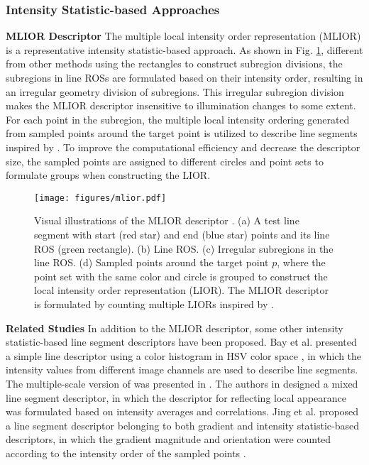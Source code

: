 \documentclass[journal,compsoc]{IEEEtran}
\begin{document}
\subsubsection{Intensity Statistic-based Approaches}
\label{subsec_description_statistic_intensity}
\textbf{MLIOR Descriptor} The multiple local intensity order representation (MLIOR) \cite{ALineMatchingMethodBasedonMultipleIntensityOrderingwithUniformlySpacedSampling} is a representative intensity statistic-based approach. As shown in Fig. \ref{mlior_demo}, different from other methods \cite{LBD,MSLD} using the rectangles to construct subregion divisions, the subregions in line ROSs are formulated based on their intensity order, resulting in an irregular geometry division of subregions. This irregular subregion division makes the MLIOR descriptor insensitive to illumination changes to some extent. For each point in the subregion, the multiple local intensity ordering generated from sampled points around the target point is utilized to describe line segments inspired by \cite{LIOP}. To improve the computational efficiency and decrease the descriptor size, the sampled points are assigned to different circles and point sets to formulate groups when constructing the LIOR.

\begin{figure}[tbp]
	\centering
	\texttt{[image: figures/mlior.pdf]}
	\caption{Visual illustrations of the MLIOR descriptor \cite{ALineMatchingMethodBasedonMultipleIntensityOrderingwithUniformlySpacedSampling}. (a) A test line segment with start (red star) and end (blue star) points and its line ROS (green rectangle). (b) Line ROS. (c) Irregular subregions in the line ROS. (d) Sampled points around the target point $p$, where the point set with the same color and circle is grouped to construct the local intensity order representation (LIOR). The MLIOR descriptor is formulated by counting multiple LIORs inspired by \cite{LIOP}.}
	\label{mlior_demo}
\end{figure}

\textbf{Related Studies}
In addition to the MLIOR descriptor, some other intensity statistic-based line segment descriptors have been proposed. Bay et al. presented a simple line descriptor using a color histogram in HSV color space \cite{Widebaselinestereomatchingwithlinesegments}, in which the intensity values from different image channels are used to describe line segments. The multiple-scale version of \cite{Widebaselinestereomatchingwithlinesegments} was presented in \cite{Scaleinvariantlinedescriptorsforwidebaselinematching}. The authors in \cite{Twoviewlinematchingalgorithmbasedoncontextandappearanceinlowtexturedimages} designed a mixed line segment descriptor, in which the descriptor for reflecting local appearance was formulated based on intensity averages and correlations. Jing et al. proposed a line segment descriptor belonging to both gradient and intensity statistic-based descriptors, in which the gradient magnitude and orientation were counted according to the intensity order of the sampled points \cite{Arobustlinematchingmethodbasedonlocalappearancedescriptorandneighboringgeometricattributes}. 
\end{document}
